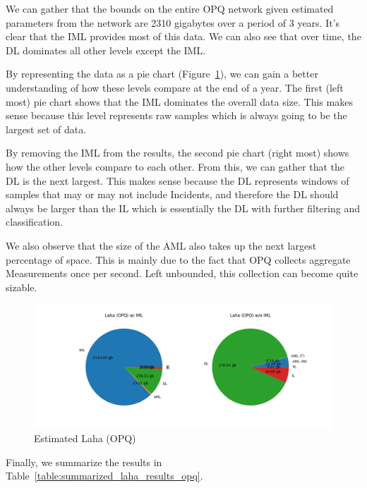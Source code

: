 We can gather that the bounds on the entire OPQ network given estimated parameters from the network are 2310 gigabytes over a period of 3 years. It's clear that the IML provides most of this data. We can also see that over time, the DL dominates all other levels except the IML\@.

By representing the data as a pie chart (Figure~\ref{fig:plot_lala_opq_pie}), we can gain a better understanding of how these levels compare at the end of a year. The first (left most) pie chart shows that the IML dominates the overall data size. This makes sense because this level represents raw samples which is always going to be the largest set of data.

By removing the IML from the results, the second pie chart (right most) shows how the other levels compare to each other. From this, we can gather that the DL is the next largest. This makes sense because the DL represents windows of samples that may or may not include Incidents, and therefore the DL should always be larger than the IL which is essentially the DL with further filtering and classification.

We also observe that the size of the AML also takes up the next largest percentage of space. This is mainly due to the fact that OPQ collects aggregate Measurements once per second. Left unbounded, this collection can become quite sizable.

\begin{figure}[H]
	\centering
	\includegraphics[width=\linewidth]{figures/plot_laha_opq_pie.png}
	\caption{Estimated Laha (OPQ)}
	\label{fig:plot_lala_opq_pie}
\end{figure}

Finally, we summarize the results in Table~\ref{table:summarized_laha_results_opq}.

